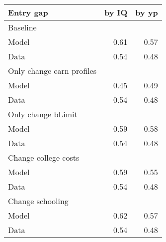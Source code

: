 \begin{tabular}{lrr}
\hline
Entry gap & by IQ  & by yp  \\ 
\hline
Baseline &   &   \\ 
Model & 0.61  & 0.57  \\ 
Data & 0.54  & 0.48  \\ 
Only change earn profiles &   &   \\ 
Model & 0.45  & 0.49  \\ 
Data & 0.54  & 0.48  \\ 
Only change bLimit &   &   \\ 
Model & 0.59  & 0.58  \\ 
Data & 0.54  & 0.48  \\ 
Change college costs &   &   \\ 
Model & 0.59  & 0.55  \\ 
Data & 0.54  & 0.48  \\ 
Change schooling &   &   \\ 
Model & 0.62  & 0.57  \\ 
Data & 0.54  & 0.48  \\ 
\hline
\end{tabular}%

